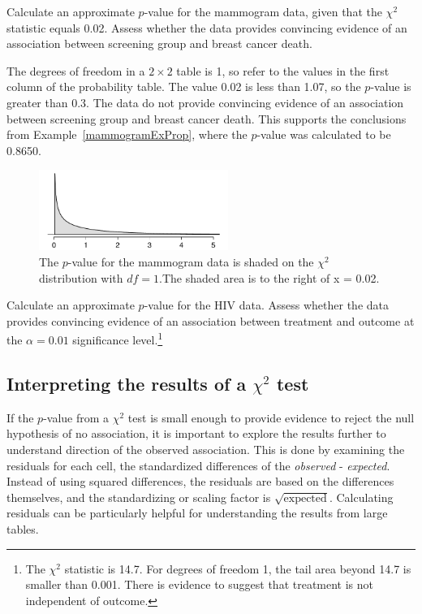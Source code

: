 \begin{example}{Calculate an approximate $p$-value for the mammogram data, given that the $\chi^2$ statistic equals 0.02. Assess whether the data provides convincing evidence of an association between screening group and breast cancer death.}

The degrees of freedom in a $2 \times 2$ table is 1, so refer to the values in the first column of the probability table. The value 0.02 is less than 1.07, so the $p$-value is greater than 0.3. The data do not provide convincing evidence of an association between screening group and breast cancer death. This supports the conclusions from Example~\ref{mammogramExProp}, where the $p$-value was calculated to be 0.8650.

\begin{figure}[h]
	\centering
	\includegraphics[width=0.55\textwidth]{ch_inference_for_props_oi_biostat/figures/mammogramPValue/mammogramPValue}
	\caption{The $p$-value for the mammogram data is shaded on the $\chi^2$ distribution with $df=1$.The shaded area is to the right of x = 0.02.}
	\label{mammogramPValue}
\end{figure}

\end{example}

\begin{exercise} Calculate an approximate $p$-value for the HIV data. Assess whether the data provides convincing evidence of an association between treatment and outcome at the $\alpha = 0.01$ significance level.\footnote{The $\chi^2$ statistic is 14.7. For degrees of freedom 1, the tail area beyond 14.7 is smaller than 0.001. There is evidence to suggest that treatment is not independent of outcome.}
\label{hivDataPValue}	
\end{exercise}

\subsection{Interpreting the results of a $\chi^2$ test}

If the $p$-value from a $\chi^2$ test is small enough to provide evidence to reject the null hypothesis of no association, it is important to explore the results further to understand direction of the observed association. This is done by examining the residuals for each cell, the standardized differences of the \emph{observed} - \emph{expected}. Instead of using squared differences, the residuals are based on the differences themselves, and the standardizing or scaling factor is $\sqrt{\text{expected}}$.  Calculating residuals can be particularly helpful for understanding the results from large tables.

